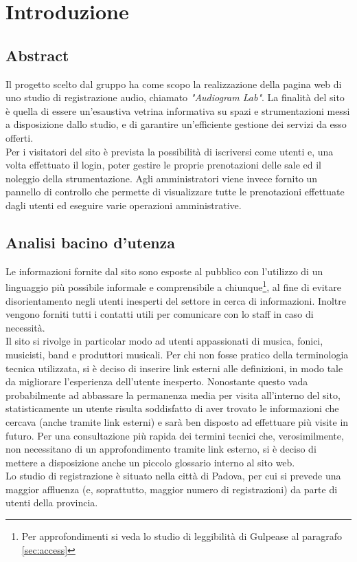 \section{Introduzione}

\vspace{8px}

\subsection{Abstract}
Il progetto scelto dal gruppo ha come scopo la realizzazione della pagina web di uno studio di registrazione audio, chiamato \emph{"Audiogram Lab"}. La finalità del sito è quella di essere un'esaustiva vetrina informativa su spazi e strumentazioni messi a disposizione dallo studio, e di garantire un'efficiente gestione dei servizi da esso offerti.\\
Per i visitatori del sito è prevista la possibilità di iscriversi come utenti e, una volta effettuato il login, poter gestire le proprie prenotazioni delle sale ed il noleggio della strumentazione. Agli amministratori viene invece fornito un pannello di controllo che permette di visualizzare tutte le prenotazioni effettuate dagli utenti ed eseguire varie operazioni amministrative.

\vspace{8px}

\subsection{Analisi bacino d'utenza}
Le informazioni fornite dal sito sono esposte al pubblico con l'utilizzo di un linguaggio più possibile informale e comprensibile a chiunque\footnote{Per approfondimenti si veda lo studio di leggibilità di Gulpease al paragrafo \ref{sec:access} }, al fine di evitare disorientamento negli utenti inesperti del settore in cerca di informazioni. Inoltre vengono forniti tutti i contatti utili per comunicare con lo staff in caso di necessità.\\
Il sito si rivolge in particolar modo ad utenti appassionati di musica, fonici, musicisti, band e produttori musicali. Per chi non fosse pratico della terminologia tecnica utilizzata, si è deciso di inserire link esterni alle definizioni, in modo tale da migliorare l'esperienza dell'utente inesperto. Nonostante questo vada probabilmente ad abbassare la permanenza media per visita all'interno del sito, statisticamente un utente risulta soddisfatto di aver trovato le informazioni che cercava (anche tramite link esterni) e sarà ben disposto ad effettuare più visite in futuro. Per una consultazione più rapida dei termini tecnici che, verosimilmente, non necessitano di un approfondimento tramite link esterno, si è deciso di mettere a disposizione anche un piccolo glossario interno al sito web. \\
Lo studio di registrazione è situato nella città di Padova, per cui si prevede una maggior affluenza (e, soprattutto, maggior numero di registrazioni) da parte di utenti della provincia.
